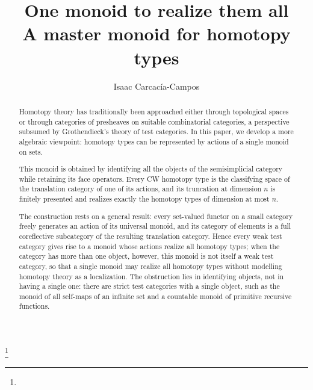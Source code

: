 \documentclass[11pt]{amsart}
\theoremstyle{definition}
\theoremstyle{remark}
\numberwithin{figure}{section}%
\begin{document}
\title[One monoid to realize them all]{One monoid to realize them all \\ A master monoid for homotopy types}
\thanks{}


\author[Isaac Carcacía-Campos]{%
	Isaac Carcacía-Campos%
}



 \address{%
           	Isaac Carcacía-Campos
            \\
              Departamento de Matem\'aticas, Universidade de Santiago de Compostela, 15782-SPAIN}




\begin{abstract}

Homotopy theory has traditionally been approached either through topological spaces or through categories of presheaves on suitable combinatorial categories, a perspective subsumed by Grothendieck's theory of test categories. In this paper, we develop a more algebraic viewpoint: homotopy types can be represented by actions of a single monoid on sets.

This monoid is obtained by identifying all the objects of the semisimplicial category while retaining its face operators. Every CW homotopy type is the classifying space of the translation category of one of its actions, and its truncation at dimension $n$ is finitely presented and realizes exactly the homotopy types of dimension at most $n$.

The construction rests on a general result: every set-valued functor on a small category freely generates an action of its universal monoid, and its category of elements is a full coreflective subcategory of the resulting translation category. Hence every weak test category gives rise to a monoid whose actions realize all homotopy types; when the category has more than one object, however, this monoid is not itself a weak test category, so that a single monoid may realize all homotopy types without modelling homotopy theory as a localization. The obstruction lies in identifying objects, not in having a single one: there are strict test categories with a single object, such as the monoid of all self-maps of an infinite set and a countable monoid of primitive recursive functions.
\end{abstract}

\end{document}

